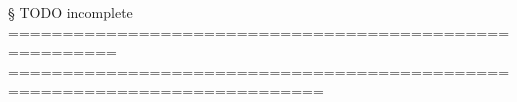 


§ TODO incomplete ========================================================
%
%
%
===========================================================================







